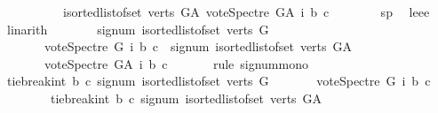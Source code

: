 \begin{isabellebody}
\ \ \ \ \ \ \ \ \ \ {\isacharparenleft}{\kern0pt}{\isasymSum}i{\isasymleftarrow}sorted{\isacharunderscore}{\kern0pt}list{\isacharunderscore}{\kern0pt}of{\isacharunderscore}{\kern0pt}set\ {\isacharparenleft}{\kern0pt}verts\ G{\isacharunderscore}{\kern0pt}A{\isacharparenright}{\kern0pt}{\isachardot}{\kern0pt}\ vote{\isacharunderscore}{\kern0pt}Spectre\ G{\isacharunderscore}{\kern0pt}A\ i\ b\ c{\isacharparenright}{\kern0pt}{\isachardoublequoteclose}\isanewline
\ \ \ \ \ \ \isamarkupfalse%
\ sp{}\ \isamarkupfalse%
\ leee\ \isamarkupfalse%
\ linarith\isanewline
\ \ \ \ \isamarkupfalse%
\ \isamarkupfalse%
\ {\isachardoublequoteopen}signum\ {\isacharparenleft}{\kern0pt}{\isasymSum}i{\isasymleftarrow}sorted{\isacharunderscore}{\kern0pt}list{\isacharunderscore}{\kern0pt}of{\isacharunderscore}{\kern0pt}set\ {\isacharparenleft}{\kern0pt}verts\ G{\isacharparenright}{\kern0pt}{\isachardot}{\kern0pt}\isanewline
\ \ \ \ \ \ \ vote{\isacharunderscore}{\kern0pt}Spectre\ G\ i\ b\ c{\isacharparenright}{\kern0pt}\ {\isasymle}\ signum\ {\isacharparenleft}{\kern0pt}{\isasymSum}i{\isasymleftarrow}sorted{\isacharunderscore}{\kern0pt}list{\isacharunderscore}{\kern0pt}of{\isacharunderscore}{\kern0pt}set\ {\isacharparenleft}{\kern0pt}verts\ G{\isacharunderscore}{\kern0pt}A{\isacharparenright}{\kern0pt}{\isachardot}{\kern0pt}\isanewline
\ \ \ \ \ \ \ vote{\isacharunderscore}{\kern0pt}Spectre\ G{\isacharunderscore}{\kern0pt}A\ i\ b\ c{\isacharparenright}{\kern0pt}{\isachardoublequoteclose}\isanewline
\ \ \ \ \ \ \isamarkupfalse%
{\isacharparenleft}{\kern0pt}rule\ signum{\isacharunderscore}{\kern0pt}mono{\isacharparenright}{\kern0pt}\isanewline
\ \ \ \ \isamarkupfalse%
\ \isamarkupfalse%
\ {\isachardoublequoteopen}tie{\isacharunderscore}{\kern0pt}break{\isacharunderscore}{\kern0pt}int\ b\ c\ {\isacharparenleft}{\kern0pt}signum\ {\isacharparenleft}{\kern0pt}{\isasymSum}i{\isasymleftarrow}sorted{\isacharunderscore}{\kern0pt}list{\isacharunderscore}{\kern0pt}of{\isacharunderscore}{\kern0pt}set\ {\isacharparenleft}{\kern0pt}verts\ G{\isacharparenright}{\kern0pt}{\isachardot}{\kern0pt}\isanewline
\ \ \ \ \ \ \ vote{\isacharunderscore}{\kern0pt}Spectre\ G\ i\ b\ c{\isacharparenright}{\kern0pt}{\isacharparenright}{\kern0pt}\ \isanewline
\ \ \ \ \ \ \ {\isasymle}\ tie{\isacharunderscore}{\kern0pt}break{\isacharunderscore}{\kern0pt}int\ b\ c\ {\isacharparenleft}{\kern0pt}signum\ {\isacharparenleft}{\kern0pt}{\isasymSum}i{\isasymleftarrow}sorted{\isacharunderscore}{\kern0pt}list{\isacharunderscore}{\kern0pt}of{\isacharunderscore}{\kern0pt}set\ {\isacharparenleft}{\kern0pt}verts\ G{\isacharunderscore}{\kern0pt}A{\isacharparenright}{\kern0pt}{\isachardot}{\kern0pt}\isanewline

\end{isabellebody}
